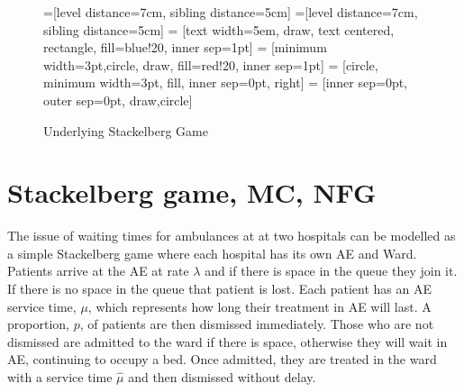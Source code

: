 \documentclass[a1,landscape]{a0poster}
\begin{document}
\vspace{1cm}
\begin{multicols}{2}


\begin{figure}[H]
    \begin{center}
        =[level distance=7cm, sibling distance=5cm]
        =[level distance=7cm, sibling distance=5cm]
         = [text width=5em, draw, text centered, rectangle, fill=blue!20, inner sep=1pt]
         = [minimum width=3pt,circle,  draw, fill=red!20, inner sep=1pt]
         = [circle, minimum width=3pt, fill, inner sep=0pt, right]
         = [inner sep=0pt, outer sep=0pt, draw,circle]
        \caption{Underlying Stackelberg Game}\label{fig:stackelberg_game}
    \end{center}
\end{figure}


\section*{Stackelberg game, MC, NFG}
The issue of waiting times for ambulances at at two hospitals can be modelled as a simple Stackelberg game where each hospital has its own AE and Ward.
Patients arrive at the AE at rate $\lambda$ and if there is space in the queue they join it.
If there is no space in the queue that patient is lost.
Each patient has an AE service time, $\mu$, which represents how long their treatment in AE will last.
A proportion, $p$, of patients are then dismissed immediately.
Those who are not dismissed are admitted to the ward if there is space, otherwise they will wait in AE, continuing to occupy a bed.
Once admitted, they are treated in the ward with a service time $\hat{\mu}$ and then dismissed without delay.



\end{multicols}
\end{document}

